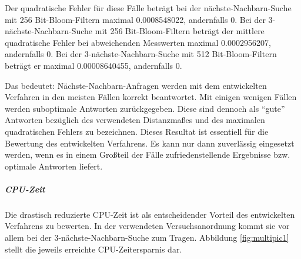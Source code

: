 Der quadratische Fehler für diese Fälle beträgt bei der nächste-Nachbarn-Suche mit 256 Bit-Bloom-Filtern maximal 0.0008548022, andernfalls 0. Bei der 3-nächste-Nachbarn-Suche mit 256 Bit-Bloom-Filtern beträgt der mittlere quadratische Fehler bei abweichenden Messwerten maximal 0.0002956207, andernfalls 0. Bei der 3-nächste-Nachbarn-Suche mit 512 Bit-Bloom-Filtern beträgt er maximal 0.00008640455, andernfalls 0.

Das bedeutet: Nächste-Nachbarn-Anfragen werden mit dem entwickelten Verfahren in den meisten Fällen korrekt beantwortet. Mit einigen wenigen Fällen werden suboptimale Antworten zurückgegeben. Diese sind dennoch als "`gute"' Antworten bezüglich des verwendeten Distanzmaßes und des maximalen quadratischen Fehlers zu bezeichnen. Dieses Resultat ist essentiell für die Bewertung des entwickelten Verfahrens. Es kann nur dann zuverlässig eingesetzt werden, wenn es in einem Großteil der Fälle zufriedenstellende Ergebnisse bzw. optimale Antworten liefert. 
\subparagraph*{CPU-Zeit}
Die drastisch reduzierte CPU-Zeit ist als entscheidender Vorteil des entwickelten Verfahrens zu bewerten. In der verwendeten Versuchsanordnung kommt sie vor allem bei der 3-nächste-Nachbarn-Suche zum Tragen. Abbildung \ref{fig:multipic1} stellt die jeweils erreichte CPU-Zeitersparnis dar.
